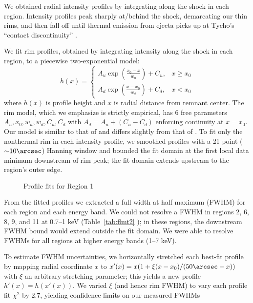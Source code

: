 \documentclass[manuscript]{aastex}  %
\newcommand{\abt}{\mathord{\sim}} %
\begin{document}
We obtained radial intensity profiles by integrating along the shock in each
region.  Intensity profiles peak sharply at/behind the shock, demarcating our
thin rims, 
and then fall off until thermal emission from ejecta picks up at Tycho's
``contact discontinuity'' \citep{warren2005}.

We fit rim profiles, obtained by integrating intensity along the shock in each
region, to a piecewise two-exponential model:
\begin{equation} \label{eq:prof}
    h(x) =
    \begin{cases}
        A_u \exp \left(\frac{x_0 - x}{w_u}\right) + C_u, &x \geq x_0 \\
        A_d \exp \left(\frac{x - x_0}{w_d}\right) + C_d, &x < x_0
    \end{cases}
\end{equation}
where $h(x)$ is profile height and $x$ is radial distance from remnant center.
The rim model, which we emphasize is strictly empirical, has 6 free parameters
$A_u, x_0, w_u, w_d, C_u, C_d$ with $A_d = A_u + (C_u - C_d)$ enforcing
continuity at $x=x_0$. Our model is similar to that of \citet{bamba2003,
bamba2005-hist} and differs slightly from that of .
To fit only the nonthermal rim in each intensity profile, we smoothed profiles
with a 21-point ($\abt 10\arcsec$) Hanning window and bounded the fit
domain at the first local data minimum downstream of rim peak; the fit domain
extends upstream to the region's outer edge.

\begin{figure}
    \caption{Profile fits for Region 1}
    \label{fig:profiles}
\end{figure}

From the fitted profiles we extracted a full width at half maximum (FWHM) for
each region and each energy band.
We could not resolve a FWHM in regions 2, 6, 8, 9, and 11  at 0.7--1 keV (Table~\ref{tab:flmt2} ); in these regions, the downstream FWHM bound
would extend outside the fit domain.  We were able to resolve FWHMs for all
regions at higher energy bands (1--7 keV).

To estimate FWHM uncertainties, we horizontally stretched each best-fit
profile by mapping radial coordinate $x$ to
$x'(x) = x (1 + \xi (x-x_0)/(50\arcsec-x))$ with $\xi$ an arbitrary stretching
parameter; this yields a new profile $h'(x) = h(x'(x))$.
We varied $\xi$ (and hence rim FWHM) to vary each profile fit $\chi^2$ by 2.7,
yielding confidence limits on our measured FWHMs
\end{document}
